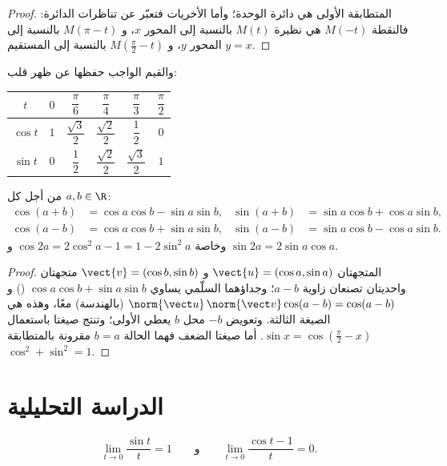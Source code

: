 \begin{proof}
المتطابقة الأولى هي  دائرة الوحدة؛ وأما الأخريات فتعبّر عن
تناظرات الدائرة: فالنقطة $M(-t)$ هي نظيرة $M(t)$ بالنسبة إلى
المحور $x$، و $M(\pi - t)$ بالنسبة إلى المحور $y$، و $M(\frac\pi2 - t)$ بالنسبة إلى المستقيم
$y = x$.
\end{proof}

والقيم الواجب حفظها عن ظهر قلب:
\begin{center}
\begin{tabular}{c|ccccc}
$t$ & $0$ & $\dfrac{\pi}{6}$ & $\dfrac{\pi}{4}$ & $\dfrac{\pi}{3}$ & $\dfrac{\pi}{2}$\\[6pt]
\hline\rule{0pt}{14pt}%
$\cos t$ & $1$ & $\dfrac{\sqrt3}{2}$ & $\dfrac{\sqrt2}{2}$ & $\dfrac12$ & $0$\\[6pt]
$\sin t$ & $0$ & $\dfrac12$ & $\dfrac{\sqrt2}{2}$ & $\dfrac{\sqrt3}{2}$ & $1$
\end{tabular}
\end{center}

\begin{proposition}\label{prop:g12:trigo:addition}
من أجل كل $a, b \in \R$:
\begin{align*}
\cos(a+b) &= \cos a \cos b - \sin a \sin b, &
\sin(a+b) &= \sin a \cos b + \cos a \sin b,\\
\cos(a-b) &= \cos a \cos b + \sin a \sin b, &
\sin(a-b) &= \sin a \cos b - \cos a \sin b.
\end{align*}
وخاصة $\cos 2a = 2\cos^2 a - 1 = 1 - 2\sin^2 a$ و
$\sin 2a = 2 \sin a \cos a$.
\end{proposition}

\begin{proof}
المتجهتان $\vect{u} = (\cos a, \sin a)$ و $\vect{v} = (\cos b, \sin b)$
متجهتان واحديتان تصنعان زاوية $a - b$؛ وجداؤهما السلّمي يساوي
$\cos a\cos b + \sin a \sin b$ () و
$\norm{\vect u}\,\norm{\vect v}\cos(a-b) = \cos(a - b)$ (بالهندسة) معًا، وهذه هي
الصيغة الثالثة. وتعويض $-b$ محل $b$ يعطي الأولى؛ وتنتج صيغتا 
باستعمال $\sin x = \cos(\frac\pi2 - x)$. أما صيغتا الضعف فهما
الحالة $b = a$ مقرونة بالمتطابقة $\cos^2 + \sin^2 = 1$.
\end{proof}

\section{الدراسة التحليلية}

\begin{lemma}\label{lem:g12:trigo:sinxx}
\[
\lim_{t \to 0} \frac{\sin t}{t} = 1
\qquad\text{و}\qquad
\lim_{t \to 0} \frac{\cos t - 1}{t} = 0 .
\]
\end{lemma}

